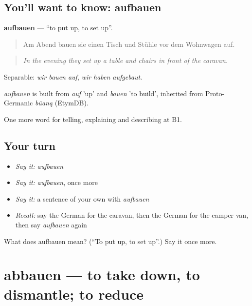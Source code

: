 \subsection*{You'll want to know: aufbauen}
\textbf{aufbauen} — \textquotedblleft{}to put up, to set up\textquotedblright{}.

\begin{quote}
Am Abend bauen sie einen Tisch und Stühle vor dem Wohnwagen auf.
\end{quote}

\begin{quote}
\emph{In the evening they set up a table and chairs in front of the caravan.}
\end{quote}

Separable: \emph{wir bauen auf}, \emph{wir haben aufgebaut}.

\begin{cousinweb}
\emph{aufbauen} is built from \emph{auf} 'up' and \emph{bauen} 'to build', inherited from Proto-Germanic \emph{būaną} (EtymDB).
\end{cousinweb}

\begin{grammarlens}[title={What you've built}]
One more word for telling, explaining and describing at B1.
\end{grammarlens}

\subsection*{Your turn}
\begin{itemize}
\raggedright
  \item \emph{Say it:} \emph{aufbauen}
  \item \emph{Say it:} \emph{aufbauen}, once more
  \item \emph{Say it:} a sentence of your own with \emph{aufbauen}
  \item \emph{Recall:} say the German for the caravan, then the German for the camper van, then say \emph{aufbauen} again
\end{itemize}

\begin{tcolorbox}[breakable,colback=teal!4,colframe=teal!35!black,title={Before you move on}]
What does aufbauen mean? (\textquotedblleft{}To put up, to set up\textquotedblright{}.) Say it once more.
\end{tcolorbox}
\section[abbauen]{abbauen — to take down, to dismantle; to reduce}

